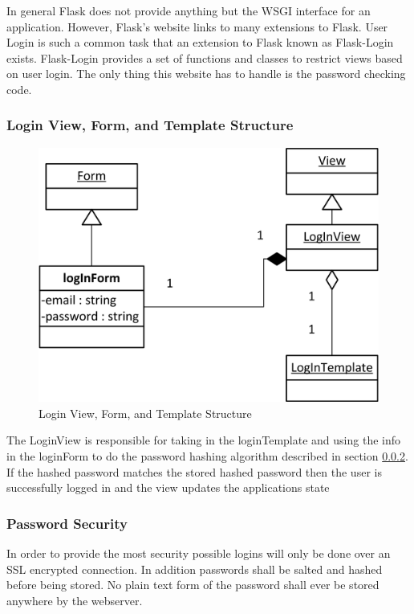 \documentclass{article}
\begin{document}
In general Flask does not provide anything but the WSGI interface for an application. However, Flask's website links to many
extensions to Flask. User Login is such a common task that an extension to Flask known as Flask-Login exists. \cite{_flask-login} Flask-Login provides a set of functions and classes to restrict views based on user login. The only thing this website has to handle is the password checking code.

\subsubsection{Login View, Form, and Template Structure}
\FloatBarrier
\begin{figure}[h!]
\centering
\includegraphics[scale=.65]{img/viewFormTemplateDiagrams/logIn}
\caption{Login View, Form, and Template Structure}
\label{fig:loginViewFormTemplateStructureDiagram}
\end{figure}
\FloatBarrier

The LoginView is responsible for taking in the loginTemplate and using the info in the loginForm to do the password hashing algorithm described in section \ref{sec:passwordSecurity}. If the hashed password matches the stored hashed password then the user is successfully logged in and the view updates the applications state

\subsubsection{Password Security}
\label{sec:passwordSecurity}

In order to provide the most security possible logins will only be done over an SSL encrypted connection. In addition passwords shall be salted and hashed before being stored. No plain text form of the password shall ever be stored anywhere by the webserver.
\end{document}
